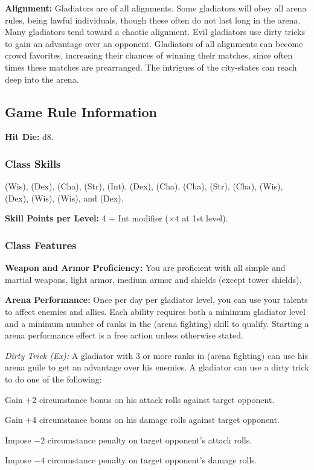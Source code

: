 \textbf{Alignment:} Gladiators are of all alignments. Some gladiators will obey all arena rules, being lawful individuals, though these often do not last long in the arena. Many gladiators tend toward a chaotic alignment. Evil gladiators use dirty tricks to gain an advantage over an opponent. Gladiators of all alignments can become crowd favorites, increasing their chances of winning their matches, since often times these matches are prearranged. The intrigues of the city-states can reach deep into the arena.

\subsection{Game Rule Information}
\textbf{Hit Die:} d8.

\subsubsection{Class Skills}
 (Wis),  (Dex),  (Cha),  (Str),  (Int),  (Dex),  (Cha),  (Cha),  (Str),  (Cha),  (Wis),  (Dex),  (Wis),  (Wis), and  (Dex).

\textbf{Skill Points per Level:} 4 + Int modifier ($\times4$ at 1st level).

\subsubsection{Class Features}
\textbf{Weapon and Armor Proficiency:} You are proficient with all simple and martial weapons, light armor, medium armor and shields (except tower shields).

\textbf{Arena Performance:} Once per day per gladiator level, you can use your talents to affect enemies and allies. Each ability requires both a minimum gladiator level and a minimum number of ranks in the  (arena fighting) skill to qualify. Starting a arena performance effect is a free action unless otherwise stated.

\textit{Dirty Trick (Ex):} A gladiator with 3 or more ranks in  (arena fighting) can use his arena guile to get an advantage over his enemies. A gladiator can use a dirty trick to do one of the following:

\begin{itemize*}
\item Gain +2 circumstance bonus on his attack rolls against target opponent.
\item Gain +4 circumstance bonus on his damage rolls against target opponent.
\item Impose $-2$ circumstance penalty on target opponent's attack rolls.
\item Impose $-4$ circumstance penalty on target opponent's damage rolls.
\end{itemize*}

